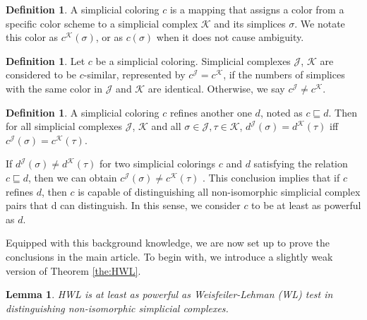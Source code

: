 \documentclass[letterpaper]{article} \usepackage{aaai24}
\theoremstyle{plain}
\newtheorem{lemma}[theorem]{Lemma}
\theoremstyle{definition}
\newtheorem{definition}[theorem]{Definition}
\theoremstyle{remark}
\begin{document}
\begin{definition}
A simplicial coloring $c$ is a mapping that assigns a color from a specific color scheme to a simplicial complex $\mathcal{K}$ and its simplices $\sigma$. We notate this color as $c^{\mathcal{K}}(\sigma)$, or as $c(\sigma)$ when it does not cause ambiguity.
\end{definition}



\begin{definition}
Let $c$ be a simplicial coloring. Simplicial complexes $\mathcal{J}$, $\mathcal{K}$ are considered to be $c$-similar, represented by $c^{\mathcal{J}}=c^{\mathcal{K}}$, if the numbers of simplices with the same color in $\mathcal{J}$ and $\mathcal{K}$ are identical. Otherwise, we say $c^{\mathcal{J}} \neq c^{\mathcal{K}}$.
\end{definition}

\begin{definition}
A simplicial coloring $c$ refines another one $d$, noted as $c \sqsubseteq d$. Then for all simplicial complexes $\mathcal{J}$, $\mathcal{K}$ and all $\sigma \in \mathcal{J}, \tau \in \mathcal{K}$, $d^{\mathcal{J}}(\sigma) = d^{\mathcal{K}}(\tau)$ iff $c^{\mathcal{J}}(\sigma) = c^{\mathcal{K}}(\tau)$.
\end{definition}

If $d^{\mathcal{J}}(\sigma) \neq d^{\mathcal{K}}(\tau)$ for two simplicial colorings $c$ and $d$ satisfying the relation $c \sqsubseteq d$, then we can obtain $c^{\mathcal{J}}(\sigma) \neq c^{\mathcal{K}}(\tau)$ \cite{SWL2021}. This conclusion implies that if $c$ refines $d$, then $c$ is capable of distinguishing all non-isomorphic simplicial complex pairs that d can distinguish. In this sense, we consider $c$ to be at least as powerful as $d$.

Equipped with this background knowledge, we are now set up to prove the conclusions in the main article. To begin with, we introduce a slightly weak version of Theorem \ref{the:HWL}.


\begin{lemma}
\label{lemma:HWL}
HWL is at least as powerful as Weisfeiler-Lehman (WL) test in distinguishing non-isomorphic simplicial complexes.
\end{lemma}
\end{document}
